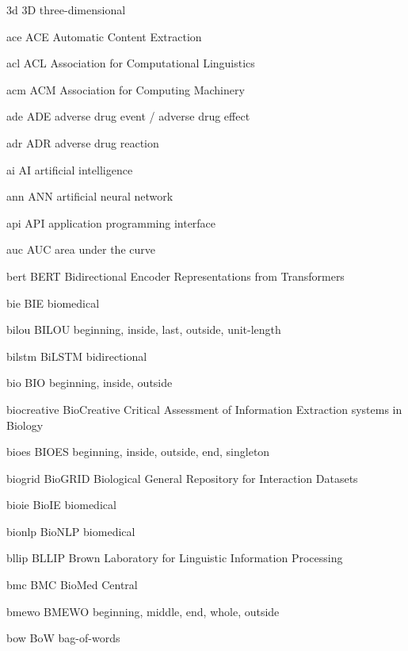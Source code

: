 \newabbreviation
{3d}
{3D}
{three-dimensional}

\newabbreviation
{ace}
{ACE}
{Automatic Content Extraction}

\newabbreviation
{acl}
{ACL}
{Association for Computational Linguistics}

\newabbreviation
{acm}
{ACM}
{Association for Computing Machinery}

\newabbreviation
{ade}
{ADE}
{adverse drug event / adverse drug effect}

\newabbreviation
{adr}
{ADR}
{adverse drug reaction}

\newabbreviation
{ai}
{AI}
{artificial intelligence}

\newabbreviation
{ann}
{ANN}
{artificial neural network}

\newabbreviation
{api}
{API}
{application programming interface}

\newabbreviation
{auc}
{AUC}
{area under the curve}

\newabbreviation
{bert}
{BERT}
{Bidirectional Encoder Representations from Transformers}

\newabbreviation
{bie}
{BIE}
{biomedical }

\newabbreviation
{bilou}
{BILOU}
{beginning, inside, last, outside, unit-length}

\newabbreviation
{bilstm}
{BiLSTM}
{bidirectional }

\newabbreviation
{bio}
{BIO}
{beginning, inside, outside}

\newabbreviation
{biocreative}
{BioCreative}
{Critical Assessment of Information Extraction systems in Biology}

\newabbreviation
{bioes}
{BIOES}
{beginning, inside, outside, end, singleton}

\newabbreviation
{biogrid}
{BioGRID}
{Biological General Repository for Interaction Datasets}

\newabbreviation
{bioie}
{BioIE}
{biomedical }

\newabbreviation
{bionlp}
{BioNLP}
{biomedical }

\newabbreviation
{bllip}
{BLLIP}
{Brown Laboratory for Linguistic Information Processing}

\newabbreviation
{bmc}
{BMC}
{BioMed Central}

\newabbreviation
{bmewo}
{BMEWO}
{beginning, middle, end, whole, outside}

\newabbreviation
{bow}
{BoW}
{bag-of-words}


